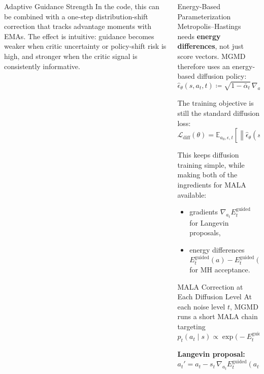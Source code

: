 \documentclass[final,hyperref={pdfpagelabels=false}]{beamer}
\newlength{\colwidth}
\newcommand{\E}{\mathbb{E}}
\begin{document}
\begin{frame}[t]
\begin{columns}[t]
\begin{column}{\colwidth}
\begin{block}{\Large Adaptive Guidance Strength}
\vspace{0.2em}
In the code, this can be combined with a one-step distribution-shift correction that tracks advantage moments with EMAs. The effect is intuitive: guidance becomes weaker when critic uncertainty or policy-shift risk is high, and stronger when the critic signal is consistently informative.
\end{block}

\end{column}

\begin{column}{\colwidth}

\begin{block}{\Large Energy-Based Parameterization}
\small
Metropolis--Hastings needs \textbf{energy differences}, not just score vectors. MGMD therefore uses an energy-based diffusion policy:
\[
\hat\epsilon_\theta(s,a_t,t)
\coloneqq
\sqrt{1-\bar\alpha_t}\,\nabla_{a_t}E_\theta(s,a_t,t).
\]

\vspace{0.3em}
The training objective is still the standard diffusion loss:
\[
\mathcal{L}_{\mathrm{diff}}(\theta)
=
\E_{a_0,\epsilon,t}
\left[
\left\lVert
\hat\epsilon_\theta\!\left(s,\sqrt{\bar\alpha_t}a_0+\sqrt{1-\bar\alpha_t}\,\epsilon,t\right)-\epsilon
\right\rVert^2
\right].
\]

\vspace{0.3em}
This keeps diffusion training simple, while making both of the ingredients for MALA available:
\begin{itemize}
    \item gradients $\nabla_{a_t}E_t^{\mathrm{guided}}$ for Langevin proposals,
    \item energy differences $E_t^{\mathrm{guided}}(a)-E_t^{\mathrm{guided}}(a')$ for MH acceptance.
\end{itemize}
\end{block}

\vspace{0.8cm}

\begin{block}{\Large MALA Correction at Each Diffusion Level}
\small
At each noise level $t$, MGMD runs a short MALA chain targeting
\[
p_t(a_t\mid s) \propto \exp\!\bigl(-E_t^{\mathrm{guided}}(a_t,s)\bigr).
\]

\vspace{0.3em}
\textbf{Langevin proposal:}
\[
a_t' = a_t - s_t\,\nabla_{a_t}E_t^{\mathrm{guided}}(a_t,s) + \sqrt{2s_t}\,z,
\qquad z\sim\mathcal{N}(0,I).
\]


\end{block}
\end{column}
\end{columns}
\end{frame}
\end{document}
